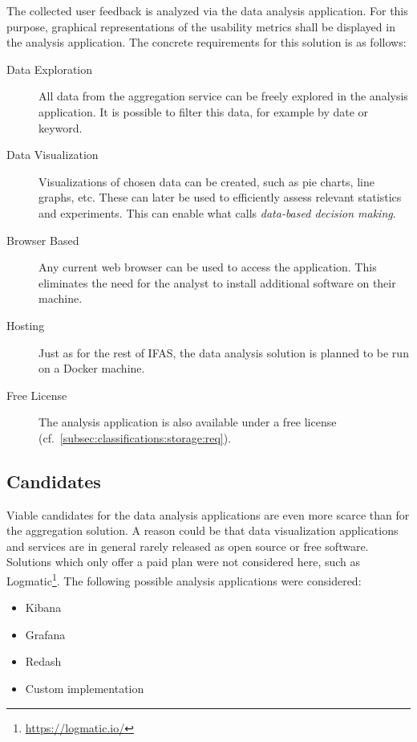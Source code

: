 The collected user feedback is analyzed via the data analysis application.
For this purpose, graphical representations of the usability metrics shall be displayed in the analysis application.
The concrete requirements for this solution is as follows:

\begin{description}
\item[Data Exploration] All data from the aggregation service can be freely explored in the analysis application.
It is possible to filter this data, for example by date or keyword.
\item[Data Visualization] Visualizations of chosen data can be created, such as pie charts, line graphs, etc.
These can later be used to efficiently assess relevant statistics and experiments.
This can enable what \citet{Bosch2012} calls \emph{data-based decision making}.
\item[Browser Based] Any current web browser can be used to access the application.
This eliminates the need for the analyst to install additional software on their machine.
\item [Hosting] Just as for the rest of \ac{IFAS}, the data analysis solution is planned to be run on a Docker machine.
\item[Free License] The analysis application is also available under a free license (cf.~\cref{subsec:classifications:storage:req}).
\end{description}

\subsection{Candidates}

Viable candidates for the data analysis applications are even more scarce than for the aggregation solution.
A reason could be that data visualization applications and services are in general rarely released as open source or free software.
Solutions which only offer a paid plan were not considered here, such as Logmatic\footnote{\url{https://logmatic.io/}}.
The following possible analysis applications were considered:

\begin{itemize}[noitemsep]
\item Kibana
\item Grafana
\item Redash
\item Custom implementation
\end{itemize}


